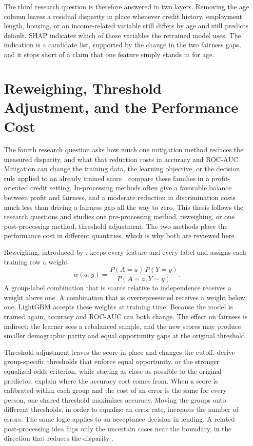 The third research question is therefore answered in two layers. Removing the age column leaves a residual disparity in place whenever credit history, employment length, housing, or an income-related variable still differs by age and still predicts default. SHAP indicates which of those variables the retrained model uses. The indication is a candidate list, supported by the change in the two fairness gaps, and it stops short of a claim that one feature simply stands in for age.

\section{Reweighing, Threshold Adjustment, and the Performance Cost}
\label{sec:related-mitigation}

The fourth research question asks how much one mitigation method reduces the measured disparity, and what that reduction costs in accuracy and ROC-AUC. Mitigation can change the training data, the learning objective, or the decision rule applied to an already trained score \citep{kozodoi2022fairness}. \citet{kozodoi2022fairness} compare these families in a profit-oriented credit setting. In-processing methods often give a favorable balance between profit and fairness, and a moderate reduction in discrimination costs much less than driving a fairness gap all the way to zero. This thesis follows the research questions and studies one pre-processing method, reweighing, or one post-processing method, threshold adjustment. The two methods place the performance cost in different quantities, which is why both are reviewed here.

Reweighing, introduced by \citet{kamiran2012reweighing}, keeps every feature and every label and assigns each training row a weight
\begin{equation}
  w(a, y) = \frac{P(A = a)\, P(Y = y)}{P(A = a, Y = y)}.
  \label{eq:reweighing}
\end{equation}
A group-label combination that is scarce relative to independence receives a weight above one. A combination that is overrepresented receives a weight below one. LightGBM accepts these weights at training time. Because the model is trained again, accuracy and ROC-AUC can both change. The effect on fairness is indirect: the learner sees a rebalanced sample, and the new scores may produce smaller demographic parity and equal opportunity gaps at the original threshold.

Threshold adjustment leaves the score in place and changes the cutoff. \citet{hardt2016equality} derive group-specific thresholds that enforce equal opportunity, or the stronger equalized-odds criterion, while staying as close as possible to the original predictor. \citet{corbettdavies2017cost} explain where the accuracy cost comes from. When a score is calibrated within each group and the cost of an error is the same for every person, one shared threshold maximizes accuracy. Moving the groups onto different thresholds, in order to equalize an error rate, increases the number of errors. The same logic applies to an acceptance decision in lending. A related post-processing idea flips only the uncertain cases near the boundary, in the direction that reduces the disparity \citep{kamiran2012reweighing}.

